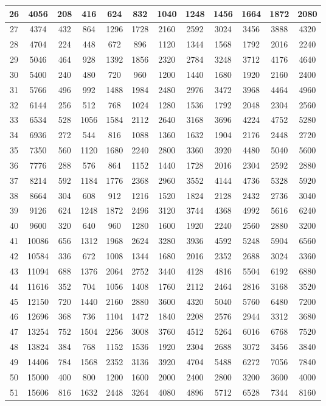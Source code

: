 \documentclass[oneside,english]{book}
\providecommand{\tabularnewline}{\\}
\begin{document}
\begin{center}
\begin{longtable}{|c|c|c|c|c|c|c|c|c|c|c|c|}
\hline
26 & 4056 & 208 & 416 & 624 & 832 & 1040 & 1248 & 1456 & 1664 & 1872 & 2080\tabularnewline
\hline
27 & 4374 & 432 & 864 & 1296 & 1728 & 2160 & 2592 & 3024 & 3456 & 3888 & 4320\tabularnewline
\hline
28 & 4704 & 224 & 448 & 672 & 896 & 1120 & 1344 & 1568 & 1792 & 2016 & 2240\tabularnewline
\hline
29 & 5046 & 464 & 928 & 1392 & 1856 & 2320 & 2784 & 3248 & 3712 & 4176 & 4640\tabularnewline
\hline
30 & 5400 & 240 & 480 & 720 & 960 & 1200 & 1440 & 1680 & 1920 & 2160 & 2400\tabularnewline
\hline
31 & 5766 & 496 & 992 & 1488 & 1984 & 2480 & 2976 & 3472 & 3968 & 4464 & 4960\tabularnewline
\hline
32 & 6144 & 256 & 512 & 768 & 1024 & 1280 & 1536 & 1792 & 2048 & 2304 & 2560\tabularnewline
\hline
33 & 6534 & 528 & 1056 & 1584 & 2112 & 2640 & 3168 & 3696 & 4224 & 4752 & 5280\tabularnewline
\hline
34 & 6936 & 272 & 544 & 816 & 1088 & 1360 & 1632 & 1904 & 2176 & 2448 & 2720\tabularnewline
\hline
35 & 7350 & 560 & 1120 & 1680 & 2240 & 2800 & 3360 & 3920 & 4480 & 5040 & 5600\tabularnewline
\hline
36 & 7776 & 288 & 576 & 864 & 1152 & 1440 & 1728 & 2016 & 2304 & 2592 & 2880\tabularnewline
\hline
37 & 8214 & 592 & 1184 & 1776 & 2368 & 2960 & 3552 & 4144 & 4736 & 5328 & 5920\tabularnewline
\hline
38 & 8664 & 304 & 608 & 912 & 1216 & 1520 & 1824 & 2128 & 2432 & 2736 & 3040\tabularnewline
\hline
39 & 9126 & 624 & 1248 & 1872 & 2496 & 3120 & 3744 & 4368 & 4992 & 5616 & 6240\tabularnewline
\hline
40 & 9600 & 320 & 640 & 960 & 1280 & 1600 & 1920 & 2240 & 2560 & 2880 & 3200\tabularnewline
\hline
41 & 10086 & 656 & 1312 & 1968 & 2624 & 3280 & 3936 & 4592 & 5248 & 5904 & 6560\tabularnewline
\hline
42 & 10584 & 336 & 672 & 1008 & 1344 & 1680 & 2016 & 2352 & 2688 & 3024 & 3360\tabularnewline
\hline
43 & 11094 & 688 & 1376 & 2064 & 2752 & 3440 & 4128 & 4816 & 5504 & 6192 & 6880\tabularnewline
\hline
44 & 11616 & 352 & 704 & 1056 & 1408 & 1760 & 2112 & 2464 & 2816 & 3168 & 3520\tabularnewline
\hline
45 & 12150 & 720 & 1440 & 2160 & 2880 & 3600 & 4320 & 5040 & 5760 & 6480 & 7200\tabularnewline
\hline
46 & 12696 & 368 & 736 & 1104 & 1472 & 1840 & 2208 & 2576 & 2944 & 3312 & 3680\tabularnewline
\hline
47 & 13254 & 752 & 1504 & 2256 & 3008 & 3760 & 4512 & 5264 & 6016 & 6768 & 7520\tabularnewline
\hline
48 & 13824 & 384 & 768 & 1152 & 1536 & 1920 & 2304 & 2688 & 3072 & 3456 & 3840\tabularnewline
\hline
49 & 14406 & 784 & 1568 & 2352 & 3136 & 3920 & 4704 & 5488 & 6272 & 7056 & 7840\tabularnewline
\hline
50 & 15000 & 400 & 800 & 1200 & 1600 & 2000 & 2400 & 2800 & 3200 & 3600 & 4000\tabularnewline
\hline
51 & 15606 & 816 & 1632 & 2448 & 3264 & 4080 & 4896 & 5712 & 6528 & 7344 & 8160\tabularnewline

\end{longtable}
\end{center}
\end{document}
